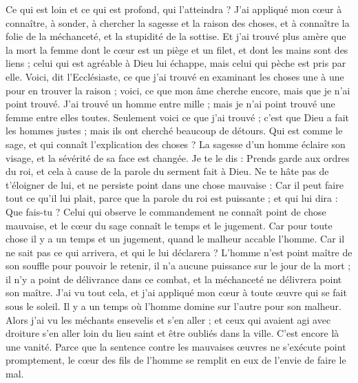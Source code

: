 \begin{multicols}{2}
Ce qui est loin et ce qui est profond, qui l’atteindra ?
J’ai appliqué mon cœur à connaître, à sonder, à chercher la sagesse et la raison des choses, et à connaître la folie de la méchanceté, et la stupidité de la sottise.
Et j'ai trouvé plus amère que la mort la femme dont le cœur est un piège et un filet, et dont les mains sont des liens ; celui qui est agréable à Dieu lui échappe, mais celui qui pèche est pris par elle.
Voici, dit l'Ecclésiaste, ce que j'ai trouvé en examinant les choses une à une pour en trouver la raison ;
voici, ce que mon âme cherche encore, mais que je n'ai point trouvé. J'ai trouvé un homme entre mille ; mais je n’ai point trouvé une femme entre elles toutes.
Seulement voici ce que j'ai trouvé ; c'est que Dieu a fait les hommes justes ; mais ils ont cherché beaucoup de détours.
\VerseOne{}Qui est comme le sage, et qui connaît l’explication des choses ? La sagesse d’un homme éclaire son visage, et la sévérité de sa face est changée.
Je te le dis : Prends garde aux ordres du roi, et cela à cause de la parole du serment fait à Dieu.
Ne te hâte pas de t’éloigner de lui, et ne persiste point dans une chose mauvaise : Car il peut faire tout ce qu'il lui plait,
parce que la parole du roi est puissante ; et qui lui dira : Que fais-tu ?
Celui qui observe le commandement ne connaît point de chose mauvaise, et le cœur du sage connaît le temps et le jugement.
Car pour toute chose il y a un temps et un jugement, quand le malheur accable l'homme.
Car il ne sait pas ce qui arrivera, et qui le lui déclarera ?
L'homme n'est point maître de son souffle pour pouvoir le retenir, il n'a aucune puissance sur le jour de la mort ; il n'y a point de délivrance dans ce combat, et la méchanceté ne délivrera point son maître.
J'ai vu tout cela, et j'ai appliqué mon cœur à toute œuvre qui se fait sous le soleil. Il y a un temps où l’homme domine sur l'autre pour son malheur.
Alors j'ai vu les méchants ensevelis et s’en aller ; et ceux qui avaient agi avec droiture s’en aller loin du lieu saint et être oubliés dans la ville. C’est encore là une vanité.
Parce que la sentence contre les mauvaises œuvres ne s'exécute point promptement, le cœur des fils de l’homme se remplit en eux de l’envie de faire le mal.

\end{multicols}
